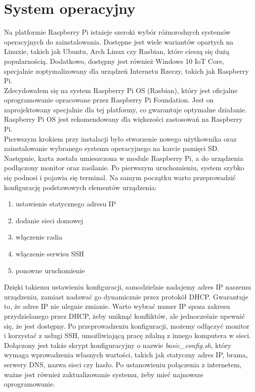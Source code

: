 \documentclass{article}
\begin{document}
\section{System operacyjny}
Na platformie Raspberry Pi istnieje szeroki wybór różnorodnych systemów operacyjnych do zainstalowania. Dostępne jest wiele wariantów opartych na Linuxie, takich jak Ubuntu, Arch Linux czy Rasbian, które cieszą się dużą popularnością. Dodatkowo, dostępny jest również Windows 10 IoT Core, specjalnie zoptymalizowany dla urządzeń Internetu Rzeczy, takich jak Raspberry Pi.\\

Zdecydowałem się na system Raspberry Pi OS (Rasbian), który jest oficjalne oprogramowanie opracowane przez Raspberry Pi Foundation. Jest on zaprojektowany specjalnie dla tej platformy, co gwarantuje optymalne działanie. Raspberry Pi OS jest rekomendowany dla większości zastosowań na Raspberry Pi.\\

Pierwszym krokiem przy instalacji było stworzenie nowego użytkownika oraz zainstalowanie wybranego systemu operacyjnego na karcie pamięci SD. Następnie, karta została umieszczona w module Raspberry Pi, a do urządzenia podłączony monitor oraz zasilanie. Po pierwszym uruchomieniu, system szybko się podnosi i pojawia się terminal.  Na samym początku warto przeprowadzić konfigurację podstawowych elementów urządzenia:

\begin{enumerate}[label=\textbullet]
  \item ustawienie statycznego adresu IP
  \item dodanie sieci domowej
  \item włączenie radia
  \item włączenie serwisu SSH
  \item ponowne uruchomienie
\end{enumerate}
Dzięki takiemu ustawieniu konfiguracji, samodzielnie nadajemy adres IP naszemu urządzeniu, zamiast nadawać go dynamicznie przez protokół DHCP. Gwarantuje to, że adres IP nie ulegnie zmianie. Warto wybrać numer IP spoza zakresu przydzielanego przez DHCP, żeby uniknąć konfliktów, ale jednocześnie upewnić się, że jest dostępny. Po przeprowadzeniu konfiguracji, możemy odłączyć monitor i korzystać z usługi SSH, umożliwiającą pracę zdalną z innego komputera w sieci.\\

Dołączony jest także skrypt konfiguracyjny o nazwie \textit{basic\_config.sh}, który wymaga wprowadzenia własnych wartości, takich jak statyczny adres IP, brama, serwery DNS, nazwa sieci czy hasło. Po ustanowieniu połączenia z internetem, ważne jest również zaktualizowanie systemu, żeby mieć najnowsze oprogramowanie.\cite{raspberrypi}
\end{document}
